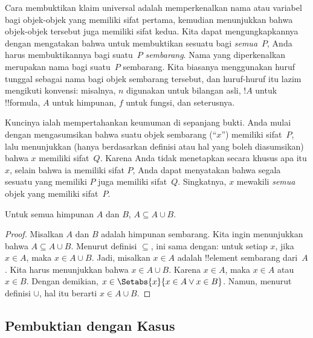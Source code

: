 \documentclass[../../../include/open-logic-section]{subfiles}
\begin{document}
Cara membuktikan klaim universal adalah memperkenalkan nama atau
variabel bagi objek-objek yang memiliki sifat pertama, kemudian
menunjukkan bahwa objek-objek tersebut juga memiliki sifat kedua. Kita
dapat mengungkapkannya dengan mengatakan bahwa untuk membuktikan
sesuatu bagi \emph{semua}~$P$, Anda harus membuktikannya bagi
suatu~$P$ \emph{sembarang}. Nama yang diperkenalkan merupakan
nama bagi suatu~$P$ sembarang. Kita biasanya menggunakan huruf tunggal
sebagai nama bagi objek sembarang tersebut, dan huruf-huruf itu lazim
mengikuti konvensi: misalnya, $n$ digunakan untuk bilangan asli, $!A$
untuk !!{formula}, $A$ untuk himpunan, $f$ untuk fungsi, dan seterusnya.

Kuncinya ialah mempertahankan keumuman di sepanjang bukti. Anda mulai
dengan mengasumsikan bahwa suatu objek sembarang (``$x$'') memiliki
sifat~$P$, lalu menunjukkan (hanya berdasarkan definisi atau hal yang
boleh diasumsikan) bahwa $x$ memiliki sifat~$Q$. Karena Anda tidak
menetapkan secara khusus apa itu $x$, selain bahwa ia memiliki sifat
$P$, Anda dapat menyatakan bahwa segala sesuatu yang memiliki $P$
juga memiliki sifat~$Q$. Singkatnya, $x$ mewakili \emph{semua} objek
yang memiliki sifat~$P$.

\begin{prop}
  Untuk semua himpunan $A$ dan $B$, $A \subseteq A \cup B$.
\end{prop}

\begin{proof}
  Misalkan $A$ dan $B$ adalah himpunan sembarang. Kita ingin menunjukkan
  bahwa $A \subseteq A \cup B$. Menurut definisi $\subseteq$, ini sama
  dengan: untuk setiap $x$, jika $x \in A$, maka $x \in A \cup B$.
  Jadi, misalkan $x \in A$ adalah !!{element} sembarang dari~$A$. Kita
  harus menunjukkan bahwa $x \in A \cup B$. Karena $x \in A$, maka
  $x \in A$ atau $x \in B$. Dengan demikian, $x \in
  \Setabs{x}{x \in A \lor x \in B}$. Namun, menurut definisi $\cup $,
  hal itu berarti $x \in A \cup B$.
\end{proof}


\subsection{Pembuktian dengan Kasus}
\end{document}
